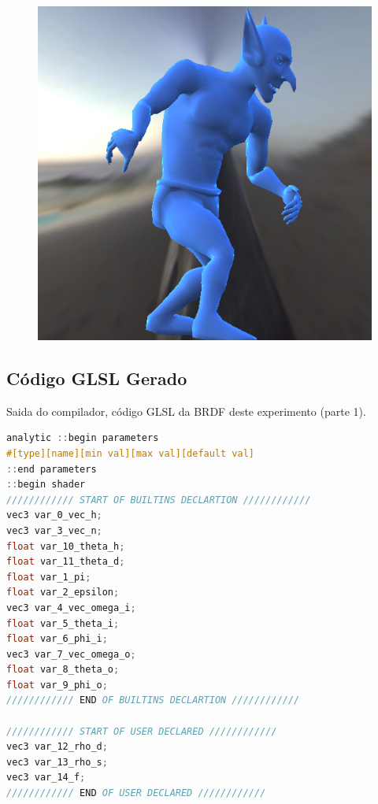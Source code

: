 \begin{figure}[H]
\endminipage\hfill
{}%
  \includegraphics[width=\linewidth]{./Imagens/brdfs/ashikhmin-shirley-alternative-goblin.png}
\endminipage
\end{figure}

\subsection{Código GLSL Gerado}
\begin{codigo}[H]
    \caption{\small Saida do compilador, código GLSL da BRDF deste experimento (parte 1). }
    \label{cod-ashikhmin-shirley-alternative-glsl-pt-1}
\begin{lstlisting}[language=C, inputencoding=utf8]
analytic ::begin parameters
#[type][name][min val][max val][default val]
::end parameters
::begin shader
//////////// START OF BUILTINS DECLARTION ////////////
vec3 var_0_vec_h;
vec3 var_3_vec_n;
float var_10_theta_h;
float var_11_theta_d;
float var_1_pi;
float var_2_epsilon;
vec3 var_4_vec_omega_i;
float var_5_theta_i;
float var_6_phi_i;
vec3 var_7_vec_omega_o;
float var_8_theta_o;
float var_9_phi_o;
//////////// END OF BUILTINS DECLARTION ////////////

//////////// START OF USER DECLARED ////////////
vec3 var_12_rho_d;
vec3 var_13_rho_s;
vec3 var_14_f;
//////////// END OF USER DECLARED ////////////
\end{lstlisting}
\end{codigo}

